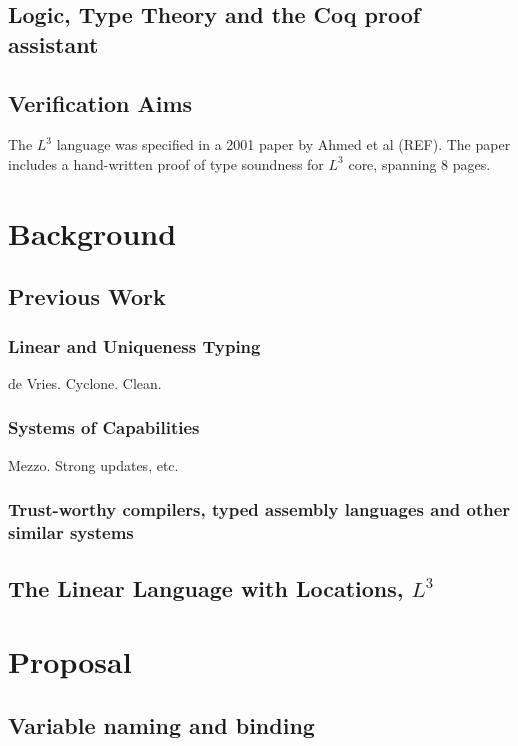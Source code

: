 \documentclass[]{unswthesis}
\begin{document}
\section{Logic, Type Theory and the Coq proof assistant}

\section{Verification Aims}

The $L^3$ language was specified in a 2001 paper by Ahmed et al (REF). The paper includes a hand-written proof of type soundness for $L^3$ core, spanning 8 pages.

\chapter{Background}
\label{ch:intro}

\section{Previous Work}

\subsection{Linear and Uniqueness Typing}

de Vries. Cyclone. Clean.

\subsection{Systems of Capabilities}

Mezzo. Strong updates, etc.

\subsection{Trust-worthy compilers, typed assembly languages and other similar systems}

\section{The Linear Language with Locations, $L^3$}

\chapter{Proposal}

\section{Variable naming and binding}
\end{document}
